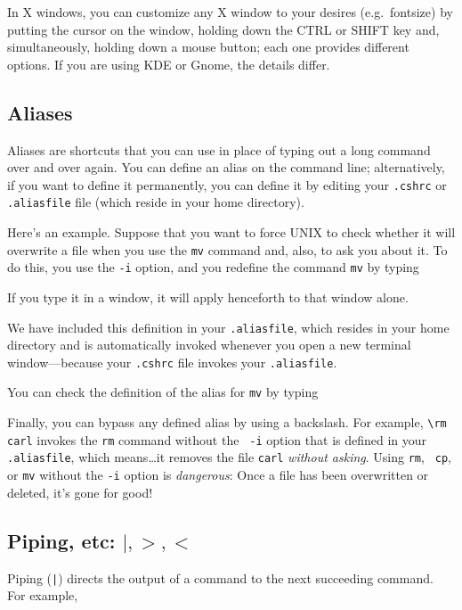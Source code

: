 \documentclass[psfig,preprint]{aastex}
\begin{document}
	In X windows, you can customize any X window to your desires
(e.g.\ fontsize) by putting the cursor on the window, holding down the
CTRL or SHIFT key and, simultaneously, holding down a mouse button; each one
provides different options.  If you are using KDE or Gnome, the details
differ. 

\subsection{Aliases}\label{short}
	
	Aliases are shortcuts that you can use in place of typing out a
long command over and over again.  You can define an alias on the
command line; alternatively, if you want to define it permanently, you
can define it by editing your {\tt .cshrc} or {\tt .aliasfile} file
(which reside in your home directory).

	Here's an example. Suppose that you want to force UNIX to check
whether it will overwrite a file when you use the {\tt mv} command and,
also, to ask you about it. To do this,
you use the {\tt -i} option, and you redefine the command {\tt mv} by
typing


\noindent If you type it in a window, it will apply henceforth to that
window alone.  

We have included this definition in your {\tt .aliasfile}, which
resides in your home directory and is automatically invoked whenever
you open a new terminal window---because your {\tt .cshrc} file invokes
your {\tt .aliasfile}. 

You can check the definition of the alias for {\tt mv} by typing


Finally, you can bypass any defined alias by using a backslash. For
example, \verb$\rm carl$ invokes the {\tt rm} command without the {\tt
-i} option that is defined in your {\tt .aliasfile}, which means\dots it
removes the file {\tt carl} {\it without asking}. Using {\tt rm}, {\tt
  cp}, or {\tt mv} without the {\tt -i} option is {\it dangerous}: Once
a file has been overwritten or deleted, it's gone for good!

\subsection{Piping, etc: $|, >, <$}\label{help}

	Piping (\verb$|$)  directs the output of a command to the next succeeding
command.  For example,
\end{document}
